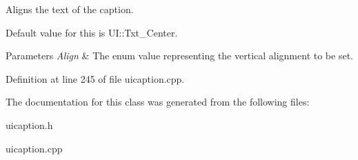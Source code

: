 Aligns the text of the caption. 

Default value for this is UI::Txt\_\-Center. 
\begin{DoxyParams}{Parameters}
{\em Align} & The enum value representing the vertical alignment to be set. \\
\hline
\end{DoxyParams}


Definition at line 245 of file uicaption.cpp.



The documentation for this class was generated from the following files:\begin{DoxyCompactItemize}
\item 
uicaption.h\item 
uicaption.cpp\end{DoxyCompactItemize}
